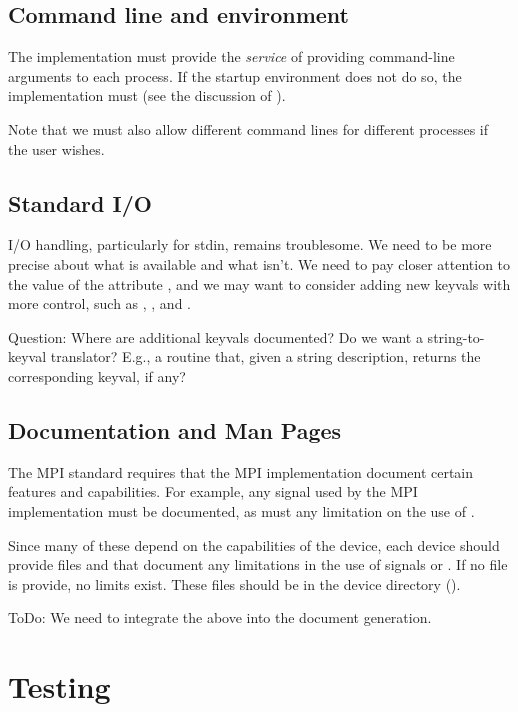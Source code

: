 \documentclass{article}
\begin{document}
\subsection{Command line and environment}
The implementation must provide the \emph{service} of providing
command-line arguments to each process.  If the startup environment
does not do so, the implementation must (see the discussion of
).  

Note that we must also allow different command lines for different processes
if the user wishes.

\subsection{Standard I/O}
I/O handling, particularly for stdin, remains troublesome.  We need to
be more precise about what is available and what isn't.  We need to
pay closer attention to the value of the attribute ,
and we may want to consider adding new keyvals with more control, such
as , , and
. 

Question:  Where are additional keyvals documented?  Do we want a
string-to-keyval translator?  E.g., a routine that, given a string
description, returns the corresponding keyval, if any?

\subsection{Documentation and Man Pages}
The MPI standard requires that the MPI implementation document certain
features and capabilities.  For example, any signal used by the MPI
implementation must be documented, as must any limitation on the use of
.  

Since many of these depend on the capabilities of the device, each device
should provide files  and  that
document any limitations in the use of signals or .  If
no file is provide, no limits exist.  These files should be in the device
directory ().

ToDo: We need to integrate the above into the document generation.

\section{Testing}
\label{sec:testing}
\end{document}
